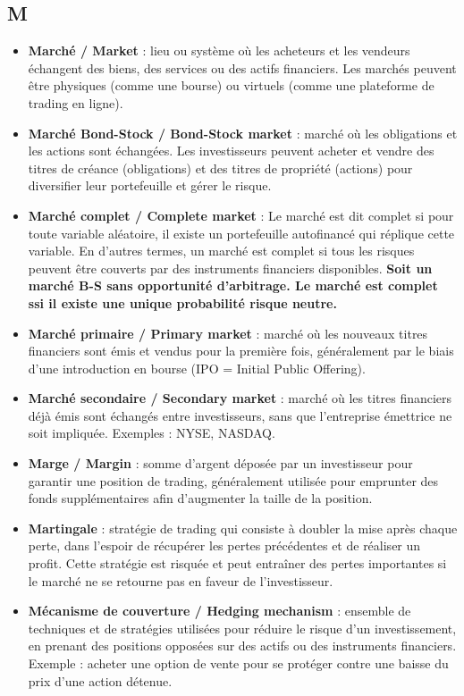 \documentclass[a4paper,10pt]{article}
\begin{document}
\begin{multicols}{2}
\section*{M}
\begin{itemize}
  \item \textbf{Marché / Market} : lieu ou système où les acheteurs et les vendeurs échangent des biens, des services ou des actifs financiers. Les marchés peuvent être physiques (comme une bourse) ou virtuels (comme une plateforme de trading en ligne).
  \item \textbf{Marché Bond-Stock / Bond-Stock market} : marché où les obligations et les actions sont échangées. Les investisseurs peuvent acheter et vendre des titres de créance (obligations) et des titres de propriété (actions) pour diversifier leur portefeuille et gérer le risque.
  \item \textbf{Marché complet / Complete market} : Le marché est dit complet si pour toute variable aléatoire, il existe un portefeuille autofinancé qui réplique cette variable. En d’autres termes, un marché est complet si tous les risques peuvent être couverts par des instruments financiers disponibles. \textbf{Soit un marché B-S sans opportunité d'arbitrage. Le marché est complet ssi il existe une unique probabilité risque neutre.}
  \item \textbf{Marché primaire / Primary market} : marché où les nouveaux titres financiers sont émis et vendus pour la première fois, généralement par le biais d’une introduction en bourse (IPO = Initial Public Offering).
  \item \textbf{Marché secondaire / Secondary market} : marché où les titres financiers déjà émis sont échangés entre investisseurs, sans que l’entreprise émettrice ne soit impliquée. Exemples : NYSE, NASDAQ.
  \item \textbf{Marge / Margin} : somme d’argent déposée par un investisseur pour garantir une position de trading, généralement utilisée pour emprunter des fonds supplémentaires afin d’augmenter la taille de la position.
  \item \textbf{Martingale} : stratégie de trading qui consiste à doubler la mise après chaque perte, dans l’espoir de récupérer les pertes précédentes et de réaliser un profit. Cette stratégie est risquée et peut entraîner des pertes importantes si le marché ne se retourne pas en faveur de l’investisseur.
  \item \textbf{Mécanisme de couverture / Hedging mechanism} : ensemble de techniques et de stratégies utilisées pour réduire le risque d’un investissement, en prenant des positions opposées sur des actifs ou des instruments financiers. Exemple : acheter une option de vente pour se protéger contre une baisse du prix d’une action détenue.

\end{itemize}
\end{multicols}
\end{document}
